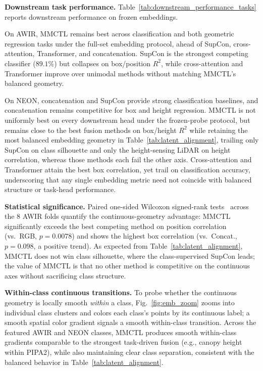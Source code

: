 \documentclass[10pt,twocolumn,letterpaper]{article}
\renewcommand{\red}[1]{#1}
\newcommand{\new}[1]{#1}
\begin{document}
\new{\noindent\textbf{Downstream task performance.}} Table~\ref{tab:downstream_performance_tasks} reports downstream performance on frozen embeddings.

\red{On AWIR, MMCTL remains best across classification and both geometric regression tasks under the full-set embedding protocol, ahead of SupCon, cross-attention, Transformer, and concatenation. SupCon is the strongest competing classifier ($89.1\%$) but collapses on box/position $R^2$, while cross-attention and Transformer improve over unimodal methods without matching MMCTL's balanced geometry.}

\red{On NEON, concatenation and SupCon provide strong classification baselines, and concatenation remains competitive for box and height regression. MMCTL is not uniformly best on every downstream head under the frozen-probe protocol, but remains close to the best fusion methods on box/height $R^2$ while retaining the most balanced embedding geometry in Table~\ref{tab:latent_alignment}, trailing only SupCon on class silhouette and only the height-sensing LiDAR on height correlation, whereas those methods each fail the other axis. Cross-attention and Transformer attain the best box correlation, yet trail on classification accuracy, underscoring that any single embedding metric need not coincide with balanced structure or task-head performance.}

\new{\noindent\textbf{Statistical significance.} Paired one-sided Wilcoxon signed-rank tests~\cite{wilcoxon1945individual} across the $8$ AWIR folds quantify the continuous-geometry advantage: MMCTL significantly exceeds the best competing method on position correlation (vs.\ RGB, $p{=}0.0078$) and shows the highest box correlation (vs.\ Concat., $p{=}0.098$, a positive trend). As expected from Table~\ref{tab:latent_alignment}, MMCTL does not win class silhouette, where the class-supervised SupCon leads; the value of MMCTL is that no other method is competitive on the continuous axes without sacrificing class structure.}

\new{\noindent\textbf{Within-class continuous transitions.} To probe whether the continuous geometry is locally smooth \emph{within} a class, Fig.~\ref{fig:emb_zoom} zooms into individual class clusters and colors each class's points by its continuous label; a smooth spatial color gradient signals a smooth within-class transition. Across the featured AWIR and NEON classes, MMCTL produces smooth within-class gradients comparable to the strongest task-driven fusion (e.g., canopy height within PIPA2), while also maintaining clear class separation, consistent with the balanced behavior in Table~\ref{tab:latent_alignment}.}
\end{document}
